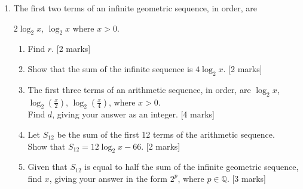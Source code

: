\documentclass[12pt, twoside]{article}
\begin{document}
\begin{enumerate}[itemsep=0.5cm]
\item The first two terms of an infinite geometric sequence, in order, are \par 
$2 \log_2 x$, $\log_2 x$ where $x > 0$.
    \begin{enumerate}[itemsep=0.5cm]
        \item Find $r$. \hfill [2 marks]
        \item Show that the sum of the infinite sequence is $4 \log_2 x$. \hfill [2 marks]
        \item The first three terms of an arithmetic sequence, in order, are $\log_2 x$, $\log_2 (\frac{x}{2})$, $\log_2 (\frac{x}{4})$, where $x>0$.\\
        Find $d$, giving your answer as an integer. \hfill [4 marks]
        \item Let $S_{12}$ be the sum of the first 12 terms of the arithmetic sequence.\\
        Show that $S_{12} = 12 \log_2 x -66$. \hfill [2 marks]
        \item Given that $S_{12}$ is equal to half the sum of the infinite geometric sequence, find $x$, giving your answer in the form $2^p$, where $p \in \mathbb{Q}$. \hfill [3 marks]
    \end{enumerate}

       
\end{enumerate}
\end{document}
